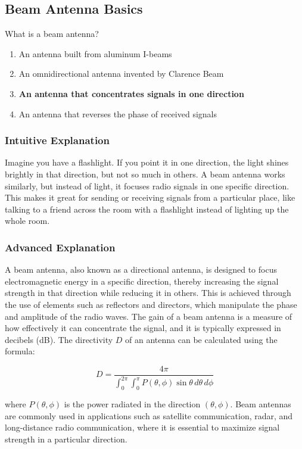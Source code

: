\subsection{Beam Antenna Basics}
\label{T9A01}

\begin{tcolorbox}[colback=gray!10!white,colframe=black!75!black,title=T9A01]
What is a beam antenna?
\begin{enumerate}[label=\Alph*)]
    \item An antenna built from aluminum I-beams
    \item An omnidirectional antenna invented by Clarence Beam
    \item \textbf{An antenna that concentrates signals in one direction}
    \item An antenna that reverses the phase of received signals
\end{enumerate}
\end{tcolorbox}

\subsubsection{Intuitive Explanation}
Imagine you have a flashlight. If you point it in one direction, the light shines brightly in that direction, but not so much in others. A beam antenna works similarly, but instead of light, it focuses radio signals in one specific direction. This makes it great for sending or receiving signals from a particular place, like talking to a friend across the room with a flashlight instead of lighting up the whole room.

\subsubsection{Advanced Explanation}
A beam antenna, also known as a directional antenna, is designed to focus electromagnetic energy in a specific direction, thereby increasing the signal strength in that direction while reducing it in others. This is achieved through the use of elements such as reflectors and directors, which manipulate the phase and amplitude of the radio waves. The gain of a beam antenna is a measure of how effectively it can concentrate the signal, and it is typically expressed in decibels (dB). The directivity \( D \) of an antenna can be calculated using the formula:

\[
D = \frac{4\pi}{\int_0^{2\pi} \int_0^\pi P(\theta, \phi) \sin\theta \, d\theta \, d\phi}
\]

where \( P(\theta, \phi) \) is the power radiated in the direction \( (\theta, \phi) \). Beam antennas are commonly used in applications such as satellite communication, radar, and long-distance radio communication, where it is essential to maximize signal strength in a particular direction.

